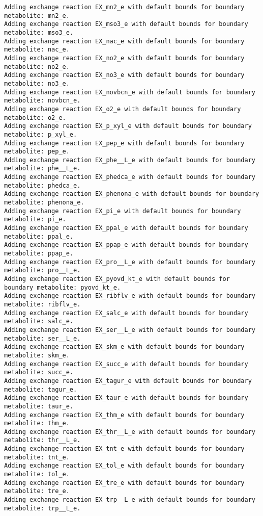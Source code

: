 \documentclass[
  letterpaper,
  DIV=11,
  numbers=noendperiod]{scrartcl}
\begin{document}
\begin{verbatim}
Adding exchange reaction EX_mn2_e with default bounds for boundary metabolite: mn2_e.
Adding exchange reaction EX_mso3_e with default bounds for boundary metabolite: mso3_e.
Adding exchange reaction EX_nac_e with default bounds for boundary metabolite: nac_e.
Adding exchange reaction EX_no2_e with default bounds for boundary metabolite: no2_e.
Adding exchange reaction EX_no3_e with default bounds for boundary metabolite: no3_e.
Adding exchange reaction EX_novbcn_e with default bounds for boundary metabolite: novbcn_e.
Adding exchange reaction EX_o2_e with default bounds for boundary metabolite: o2_e.
Adding exchange reaction EX_p_xyl_e with default bounds for boundary metabolite: p_xyl_e.
Adding exchange reaction EX_pep_e with default bounds for boundary metabolite: pep_e.
Adding exchange reaction EX_phe__L_e with default bounds for boundary metabolite: phe__L_e.
Adding exchange reaction EX_phedca_e with default bounds for boundary metabolite: phedca_e.
Adding exchange reaction EX_phenona_e with default bounds for boundary metabolite: phenona_e.
Adding exchange reaction EX_pi_e with default bounds for boundary metabolite: pi_e.
Adding exchange reaction EX_ppal_e with default bounds for boundary metabolite: ppal_e.
Adding exchange reaction EX_ppap_e with default bounds for boundary metabolite: ppap_e.
Adding exchange reaction EX_pro__L_e with default bounds for boundary metabolite: pro__L_e.
Adding exchange reaction EX_pyovd_kt_e with default bounds for boundary metabolite: pyovd_kt_e.
Adding exchange reaction EX_ribflv_e with default bounds for boundary metabolite: ribflv_e.
Adding exchange reaction EX_salc_e with default bounds for boundary metabolite: salc_e.
Adding exchange reaction EX_ser__L_e with default bounds for boundary metabolite: ser__L_e.
Adding exchange reaction EX_skm_e with default bounds for boundary metabolite: skm_e.
Adding exchange reaction EX_succ_e with default bounds for boundary metabolite: succ_e.
Adding exchange reaction EX_tagur_e with default bounds for boundary metabolite: tagur_e.
Adding exchange reaction EX_taur_e with default bounds for boundary metabolite: taur_e.
Adding exchange reaction EX_thm_e with default bounds for boundary metabolite: thm_e.
Adding exchange reaction EX_thr__L_e with default bounds for boundary metabolite: thr__L_e.
Adding exchange reaction EX_tnt_e with default bounds for boundary metabolite: tnt_e.
Adding exchange reaction EX_tol_e with default bounds for boundary metabolite: tol_e.
Adding exchange reaction EX_tre_e with default bounds for boundary metabolite: tre_e.
Adding exchange reaction EX_trp__L_e with default bounds for boundary metabolite: trp__L_e.

\end{verbatim}
\end{document}
